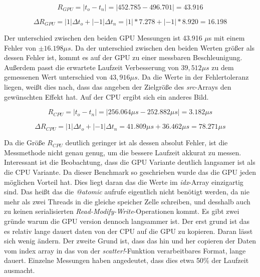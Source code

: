 $$
 R_{GPU} = | t_o - t_n | = | 452.785 - 496.701 | = 43.916
$$

$$
 \Delta R_{GPU} = | 1 | \Delta t_o + |-1| \Delta t_n = | 1| * 7.278 +  |-1| * 8.920 = 16.198
$$

Der unterschied zwischen den beiden GPU Messungen ist 43.916 $\mu$s mit einem Fehler von $\pm 16.198 \mu s$.
Da der unterschied zwischen den beiden Werten größer als dessen Fehler ist, kommt es auf der GPU zu einer messbaren Beschleunigung.
Außerdem passt die erwartete Laufzeit Verbesserung von $39,512 \mu s$ zu dem gemessenen Wert unterschied von $43,916 \mu s$.
Da die Werte in der Fehlertoleranz liegen, weißt dies nach, dass das angeben der Zielgröße des \textit{src}-Arrays den gewünschten Effekt hat.
Auf der CPU ergibt sich ein anderes Bild.

$$
R_{CPU} = |t_o - t_n| = | 256.064 \mu s - 252.882 \mu s | =  3.182 \mu s
$$

$$
\Delta R_{CPU} = | 1 | \Delta t_o + |-1| \Delta t_n  = 41.809 \mu s + 36.462 \mu s = 78.271 \mu s
$$


Da die Größe $R_{CPU}$ deutlich geringer ist als dessen absolut Fehler, ist die Messmethode nicht genau genug, um die bessere Laufzeit akkurat zu messen.
Interessant ist die Beobachtung, dass die GPU Variante deutlich langsamer ist als die CPU Variante.
Da dieser Benchmark so geschrieben wurde das die GPU jeden möglichen Vorteil hat.
Dies liegt daran das die Werte im \textit{idx}-Array einzigartig sind.
Das heißt das die \textit{@atomic} aufrufe eigentlich nicht benötigt werden, da nie mehr als zwei Threads in die gleiche speicher Zelle schreiben,
und desshalb auch zu keinen serialisierten \textit{Read-Modify-Write}-Operationen kommt.
Es gibt zwei gründe warum die GPU version dennoch langsammer ist.
Der erst grund ist das es relativ lange dauert daten von der CPU auf die GPU zu kopieren.
Daran lässt sich wenig ändern.
Der zweite Grund ist, dass das hin und her copieren der Daten vom index array in das von der \textit{scatter!}-Funktion verarbeitbares Format, 
lange dauert. Einzelne Messungen haben angedeutet, dass dies etwa 50\% der Laufzeit ausmacht.



